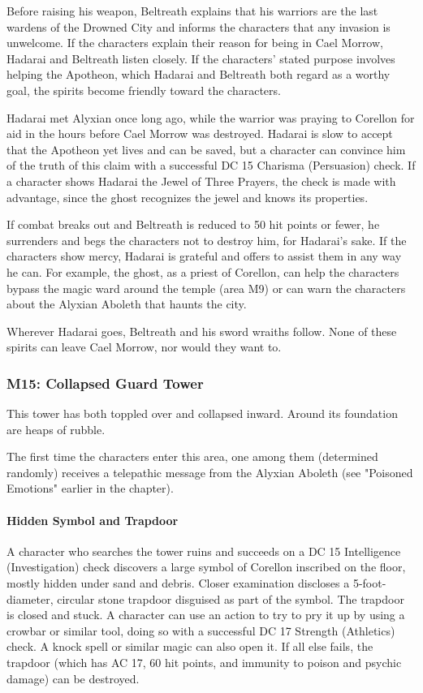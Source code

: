 \documentclass[10pt,a4paper,twoside,bg=print,twocolumn,openany,nodeprecatedcode]{dndbook}
\begin{document}
Before raising his weapon, Beltreath explains that his warriors are the last wardens of the Drowned City and informs the characters that any invasion is unwelcome. If the characters explain their reason for being in Cael Morrow, Hadarai and Beltreath listen closely. If the characters' stated purpose involves helping the Apotheon, which Hadarai and Beltreath both regard as a worthy goal, the spirits become friendly toward the characters.

Hadarai met Alyxian once long ago, while the warrior was praying to Corellon for aid in the hours before Cael Morrow was destroyed. Hadarai is slow to accept that the Apotheon yet lives and can be saved, but a character can convince him of the truth of this claim with a successful DC 15 Charisma (Persuasion) check. If a character shows Hadarai the Jewel of Three Prayers, the check is made with advantage, since the ghost recognizes the jewel and knows its properties.

If combat breaks out and Beltreath is reduced to 50 hit points or fewer, he surrenders and begs the characters not to destroy him, for Hadarai's sake. If the characters show mercy, Hadarai is grateful and offers to assist them in any way he can. For example, the ghost, as a priest of Corellon, can help the characters bypass the magic ward around the temple (area M9) or can warn the characters about the Alyxian Aboleth that haunts the city.

Wherever Hadarai goes, Beltreath and his sword wraiths follow. None of these spirits can leave Cael Morrow, nor would they want to.

\subsubsection{M15: Collapsed Guard Tower}
\begin{DndReadAloud}{}
This tower has both toppled over and collapsed inward. Around its foundation are heaps of rubble.

\end{DndReadAloud}

The first time the characters enter this area, one among them (determined randomly) receives a telepathic message from the Alyxian Aboleth (see "Poisoned Emotions" earlier in the chapter).

\paragraph{Hidden Symbol and Trapdoor}
A character who searches the tower ruins and succeeds on a DC 15 Intelligence (Investigation) check discovers a large symbol of Corellon inscribed on the floor, mostly hidden under sand and debris. Closer examination discloses a 5-foot-diameter, circular stone trapdoor disguised as part of the symbol. The trapdoor is closed and stuck. A character can use an action to try to pry it up by using a crowbar or similar tool, doing so with a successful DC 17 Strength (Athletics) check. A knock spell or similar magic can also open it. If all else fails, the trapdoor (which has AC 17, 60 hit points, and immunity to poison and psychic damage) can be destroyed.
\end{document}
